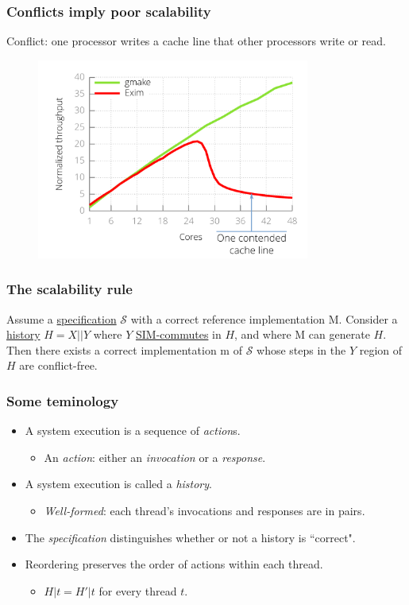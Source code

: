 \documentclass{beamer}
\begin{document}
\begin{frame}
\frametitle{Conflicts imply poor scalability}
Conflict: one processor writes a cache line that other processors write or
 read.
 
 \begin{figure}
   \includegraphics[width=0.8\textwidth]{799-s14-docs/cache_line_contention.png}
 \end{figure}

\end{frame}

\begin{frame}
\frametitle{The scalability rule}
Assume a \uline{specification} $\mathscr{S}$ with a correct reference 
implementation M. Consider a \uline{history} $H = X || Y$ where $Y$ 
\uline{SIM-commutes} in $H$, 
and where M can generate $H$. Then there exists a correct implementation m of 
$\mathscr{S}$ whose steps in the $Y$ region of $H$ are conflict-free.
\end{frame}

\begin{frame}
\frametitle{Some teminology}

\begin{itemize}
\item A system execution is a sequence of \emph{action}s.
\begin{itemize}
\item An \emph{action}: either an \emph{invocation} or a \emph{response}.
\end{itemize}
\item A system execution is called a \emph{history}.
\begin{itemize}
\item \emph{Well-formed}: each thread's invocations and responses are in pairs.
\end{itemize}
\item The \emph{specification} distinguishes whether or not a history is 
  ``correct".
\item Reordering preserves the order of actions within each thread.
\begin{itemize}
\item $H|t = H'|t$ for every thread $t$.
\end{itemize}
\end{itemize}
\end{frame}
\end{document}
